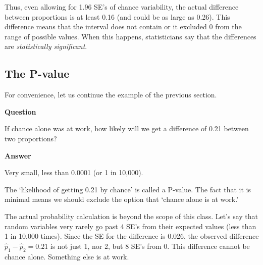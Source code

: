 \documentclass[11pt, chapterprefix=true]{scrbook}\usepackage[]{graphicx}\usepackage[]{color}
\begin{document}
Thus, even allowing for 1.96 SE's of chance variability, the actual difference between proportions is at least 0.16 (and could be as large as 0.26).  This difference means that the interval does not contain or it excluded 0 from the range of possible values.  When this happens, statisticians say that the differences are \textit{statistically significant}.


\subsection{The P-value}

For convenience, let us continue the example of the previous section.

\begin{minipage}[ht]{3cm}

\vspace{-4mm}

\textbf{Question}
\end{minipage}
\begin{minipage}[ht]{12cm}

\parbox{12cm}{
If chance alone was at work, how likely will we get a difference of 0.21 between two proportions?
}
\end{minipage}

\begin{minipage}[ht]{3cm}

\vspace{-3mm}

\textbf{Answer}
\end{minipage}
\begin{minipage}[ht]{12cm}

\parbox{12cm}{
Very small, less than 0.0001 (or 1 in 10,000).
}
\end{minipage}

The `likelihood of getting 0.21 by chance' is called a P-value. The fact that it is minimal means we should exclude the option that `chance alone is at work.'

The actual probability calculation is beyond the scope of this class.  Let's say that random variables very rarely go past 4 SE's from their expected values (less than 1 in 10,000 times).  Since the SE for the difference is 0.026, the observed difference $\hat{p}_1 - \hat{p}_2 = 0.21$  is not just 1, nor 2, but 8 SE's from 0.  This difference cannot be chance alone.   Something else is at work.
\end{document}
